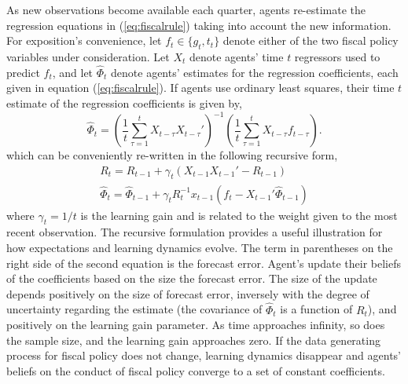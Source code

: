 \documentclass[12pt]{article}
\newcommand{\beq}{\begin{equation}}
\newcommand{\eeq}{\end{equation}}
\begin{document}
As new observations become available each quarter, agents re-estimate the regression equations in (\ref{eq:fiscalrule}) taking into account the new information.  For exposition's convenience, let $f_t \in \{g_t, t_t\}$ denote either of the two fiscal policy variables under consideration.  Let $X_{t}$ denote agents' time $t$ regressors used to predict $f_t$, and let $\hat{\Phi}_{t}$ denote agents' estimates for the regression coefficients, each given in equation (\ref{eq:fiscalrule}).  If agents use ordinary least squares, their time $t$ estimate of the regression coefficients is given by,
\beq \label{eq:ols} \hat{\Phi}_t = \left( \frac{1}{t} \sum_{\tau=1}^{t} X_{t-\tau} X_{t-\tau}' \right)^{-1}  \left( \frac{1}{t} \sum_{\tau=1}^{t} X_{t-\tau}  f_{t-\tau} \right). \eeq
which can be conveniently re-written in the following recursive form,
\beq \label{eq:ln} \begin{array}{c}
R_t = R_{t-1} + \gamma_t \left(X_{t-1} X_{t-1}' - R_{t-1}\right) \\ [0.5pc]
\hat{\Phi}_t = \hat{\Phi}_{t-1} + \gamma_t  R_t^{-1} x_{t-1} \left(f_{t} - X_{t-1}'\hat{\Phi}_{t-1}\right) 
\end{array} \eeq
where $\gamma_{t} = 1/t$ is the learning gain and is related to the weight given to the most recent observation.  The recursive formulation provides a useful illustration for how expectations and learning dynamics evolve.  The term in parentheses on the right side of the second equation is the forecast error.  Agent's update their beliefs of the coefficients based on the size the forecast error.  The size of the update depends positively on the size of forecast error, inversely with the degree of uncertainty regarding the estimate (the covariance of $\hat{\Phi}_t$ is a function of $R_t$), and positively on the learning gain parameter.  As time approaches infinity, so does the sample size, and the learning gain approaches zero.  If the data generating process for fiscal policy does not change, learning dynamics disappear and agents' beliefs on the conduct of fiscal policy converge to a set of constant coefficients.
\end{document}
